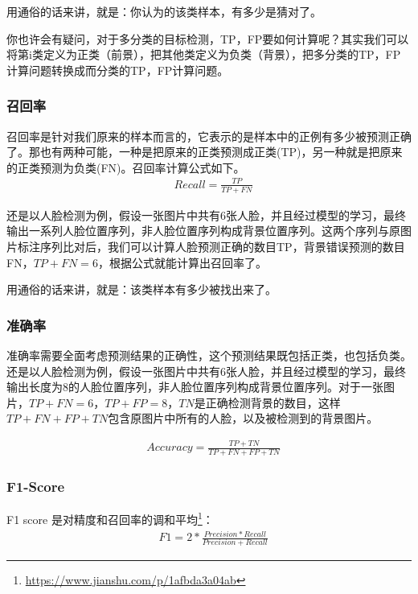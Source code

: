 用通俗的话来讲，就是：你认为的该类样本，有多少是猜对了。

你也许会有疑问，对于多分类的目标检测，TP，FP要如何计算呢？其实我们可以将第i类定义为正类（前景），把其他类定义为负类（背景），把多分类的TP，FP计算问题转换成而分类的TP，FP计算问题。

\subsubsection{召回率}

召回率是针对我们原来的样本而言的，它表示的是样本中的正例有多少被预测正确了。那也有两种可能，一种是把原来的正类预测成正类(TP)，另一种就是把原来的正类预测为负类(FN)。召回率计算公式如下。
\begin{align}
& Recall = \frac{TP}{TP + FN}
\end{align}

还是以人脸检测为例，假设一张图片中共有6张人脸，并且经过模型的学习，最终输出一系列人脸位置序列，非人脸位置序列构成背景位置序列。这两个序列与原图片标注序列比对后，我们可以计算人脸预测正确的数目TP，背景错误预测的数目FN，$TP + FN = 6$，根据公式就能计算出召回率了。

用通俗的话来讲，就是：该类样本有多少被找出来了。

\subsubsection{准确率}

准确率需要全面考虑预测结果的正确性，这个预测结果既包括正类，也包括负类。还是以人脸检测为例，假设一张图片中共有6张人脸，并且经过模型的学习，最终输出长度为8的人脸位置序列，非人脸位置序列构成背景位置序列。对于一张图片，$TP + FN = 6$，$TP + FP = 8$，$TN$是正确检测背景的数目，这样$TP+FN+FP+TN$包含原图片中所有的人脸，以及被检测到的背景图片。

\begin{align}
& Accuracy = \frac{TP+TN}{TP+FN+FP+TN}
\end{align}

\subsubsection{F1-Score}

F1 score 是对精度和召回率的调和平均\footnote{\url{https://www.jianshu.com/p/1afbda3a04ab}}：
\begin{align}
& F1 = 2 * \frac{Precision * Recall}{Precision + Recall}
\end{align}


